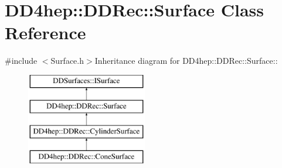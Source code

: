 \hypertarget{class_d_d4hep_1_1_d_d_rec_1_1_surface}{
\section{DD4hep::DDRec::Surface Class Reference}
\label{class_d_d4hep_1_1_d_d_rec_1_1_surface}
}


{\ttfamily \#include $<$Surface.h$>$}Inheritance diagram for DD4hep::DDRec::Surface::\begin{figure}[H]
\begin{center}
\leavevmode
\includegraphics[height=4cm]{class_d_d4hep_1_1_d_d_rec_1_1_surface}
\end{center}
\end{figure}
